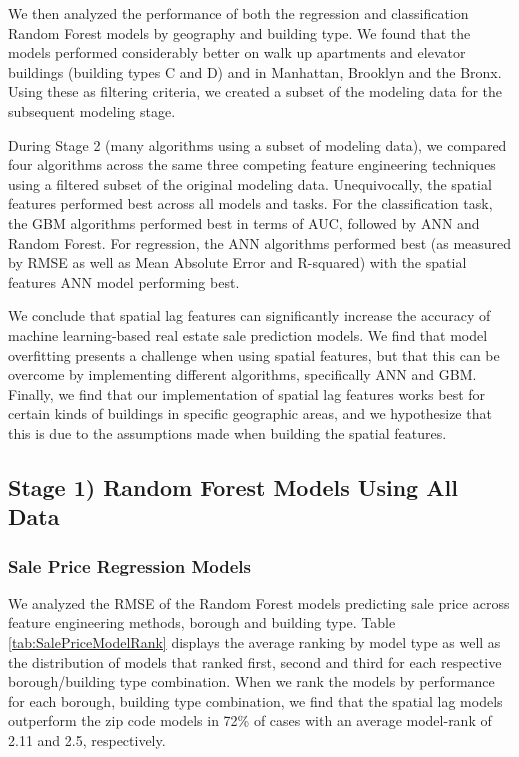 \documentclass[conference,final,]{IEEEtran}
\begin{document}
We then analyzed the performance of both the regression and
classification Random Forest models by geography and building type. We
found that the models performed considerably better on walk up
apartments and elevator buildings (building types C and D) and in
Manhattan, Brooklyn and the Bronx. Using these as filtering criteria, we
created a subset of the modeling data for the subsequent modeling stage.

During Stage 2 (many algorithms using a subset of modeling data), we
compared four algorithms across the same three competing feature
engineering techniques using a filtered subset of the original modeling
data. Unequivocally, the spatial features performed best across all
models and tasks. For the classification task, the GBM algorithms
performed best in terms of AUC, followed by ANN and Random Forest. For
regression, the ANN algorithms performed best (as measured by RMSE as
well as Mean Absolute Error and R-squared) with the spatial features ANN
model performing best.

We conclude that spatial lag features can significantly increase the
accuracy of machine learning-based real estate sale prediction models.
We find that model overfitting presents a challenge when using spatial
features, but that this can be overcome by implementing different
algorithms, specifically ANN and GBM. Finally, we find that our
implementation of spatial lag features works best for certain kinds of
buildings in specific geographic areas, and we hypothesize that this is
due to the assumptions made when building the spatial features.

\hypertarget{stage-1-random-forest-models-using-all-data}{%
\subsection{Stage 1) Random Forest Models Using All
Data}\label{stage-1-random-forest-models-using-all-data}}

\hypertarget{sale-price-regression-models}{%
\subsubsection{Sale Price Regression
Models}\label{sale-price-regression-models}}

We analyzed the RMSE of the Random Forest models predicting sale price
across feature engineering methods, borough and building type. Table
\ref{tab:SalePriceModelRank} displays the average ranking by model type
as well as the distribution of models that ranked first, second and
third for each respective borough/building type combination. When we
rank the models by performance for each borough, building type
combination, we find that the spatial lag models outperform the zip code
models in 72\% of cases with an average model-rank of 2.11 and 2.5,
respectively.
\end{document}
